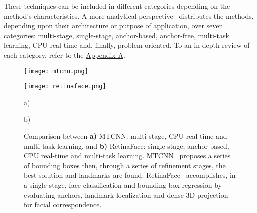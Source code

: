 \documentclass[class=report, crop=false, a4paper, 12pt]{standalone}
\begin{document}
\par These techniques can be included in different categories depending on the method's characteristics. A more analytical perspective~\autocite{duElementsEndtoendDeep2022} distributes the methods, depending upon their architecture or purpose of application, over seven categories: multi-stage, single-stage, anchor-based, anchor-free, multi-task learning, CPU real-time and, finally, problem-oriented. To an in depth review of each category, refer to the \hyperref[appendix:face_detection_appendix]{Appendix A}.

\vspace{0.5\baselineskip}
\begin{figure}[h!]
    \centering
    \begin{minipage}[c]{0.38\textwidth}
      \centering
      \texttt{[image: mtcnn.png]}
      \label{fig:mtcnn}
    \end{minipage}
    \hspace{0.5cm}
    \begin{minipage}[c]{0.52\textwidth}
      \centering
      \texttt{[image: retinaface.png]}
      \label{fig:retinaface}
    \end{minipage} 
    \begin{minipage}{0.4\textwidth}
        \vspace{-0.5cm}
        \centering
        \footnotesize a)
    \end{minipage}
    \hfill
    \begin{minipage}{0.4\textwidth}
        \vspace{-0.5cm}
        \centering
        \footnotesize b)
    \end{minipage}
    \vspace{-0.4cm}
    \caption[Comparison between MTCNN and RetinaFace.]{Comparison between \textbf{a)} MTCNN: multi-stage, CPU real-time and multi-task learning, and \textbf{b)} RetinaFace: single-stage, anchor-based, CPU real-time and multi-task learning. MTCNN~\autocite{zhangJointFaceDetection2016a} proposes a series of bounding boxes then, through a series of refinement stages, the best solution and landmarks are found. RetinaFace~\autocite{dengRetinaFaceSinglestageDense2019} accomplishes, in a single-stage, face classification and bounding box regression by evaluating anchors, landmark localization and dense 3D projection for facial correspondence.}
    \label{fig:mtcnn vs retinaface}
\end{figure}
\end{document}
